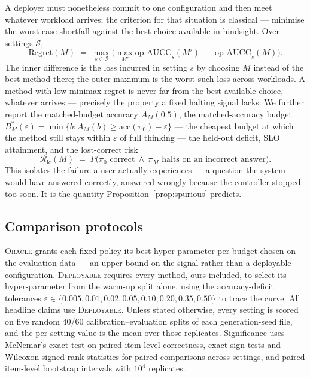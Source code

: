 \documentclass[acmsmall]{acmart}
\theoremstyle{acmdefinition}%
\theoremstyle{acmplain}}{}%
\begin{document}
A deployer must nonetheless commit to one configuration and then meet whatever workload arrives; the criterion for that situation is classical --- minimise the worst-case shortfall against the best choice available in hindsight. Over settings $\mathcal{S}$,
\begin{equation}
\mathrm{Regret}(M) \;=\; \max_{s \in \mathcal{S}} \Big( \max_{M'} \text{op-AUCC}_s(M') \;-\; \text{op-AUCC}_s(M) \Big).
\label{eq:regret}
\end{equation}
The inner difference is the loss incurred in setting $s$ by choosing $M$ instead of the best method there; the outer maximum is the worst such loss across workloads. A method with low minimax regret is never far from the best available choice, whatever arrives --- precisely the property a fixed halting signal lacks. We further report the matched-budget accuracy $A_M(0.5)$, the matched-accuracy budget $B^\ast_M(\varepsilon) = \min\{b : A_M(b) \geq \mathrm{acc}(\pi_0)-\varepsilon\}$ --- the cheapest budget at which the method still stays within $\varepsilon$ of full thinking --- the held-out deficit, SLO attainment, and the lost-correct risk
\begin{equation}
\mathcal{R}_{\mathrm{lc}}(M) \;=\; P\big(\pi_0 \text{ correct} \ \wedge\ \pi_M \text{ halts on an incorrect answer}\big).
\label{eq:lostcorrect}
\end{equation}
This isolates the failure a user actually experiences --- a question the system would have answered correctly, answered wrongly because the controller stopped too soon. It is the quantity Proposition~\ref{prop:spurious} predicts.

\subsection{Comparison protocols}
\textsc{Oracle} grants each fixed policy its best hyper-parameter per budget chosen on the evaluation data --- an upper bound on the signal rather than a deployable configuration. \textsc{Deployable} requires every method, ours included, to select its hyper-parameter from the warm-up split alone, using the accuracy-deficit tolerances $\varepsilon \in \{0.005, 0.01, 0.02, 0.05, 0.10, 0.20, 0.35, 0.50\}$ to trace the curve. All headline claims use \textsc{Deployable}. Unless stated otherwise, every setting is scored on five random $40/60$ calibration--evaluation splits of each generation-seed file, and the per-setting value is the mean over those replicates. Significance uses McNemar's exact test on paired item-level correctness, exact sign tests and Wilcoxon signed-rank statistics for paired comparisons across settings, and paired item-level bootstrap intervals with $10^4$ replicates.
\end{document}
